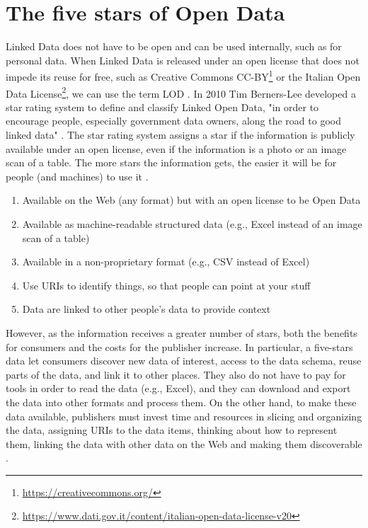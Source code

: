 \section{The five stars of Open Data}
\label{sec:opendatastars}

\newcommand{\Stars}[1]{\clone{#1}{\textcolor{StarColor}{\Large$\bigstar$}}}

Linked Data does not have to be open and can be used internally, such as for personal data. When Linked Data is released under an open license that does not impede its reuse for free, such as Creative Commons CC-BY\footnote{\url{https://creativecommons.org/}} or the Italian Open Data License\footnote{\url{https://www.dati.gov.it/content/italian-open-data-license-v20}}, we can use the term \ac{LOD} \cite{berners2006linked}. In 2010 Tim Berners-Lee developed a star rating system to define and classify Linked Open Data, "in order to encourage people, especially government data owners, along the road to good linked data" \cite{berners2006linked}. The star rating system assigns a star if the information is publicly available under an open license, even if the information is a photo or an image scan of a table. The more stars the information gets, the easier it will be for people (and machines) to use it \cite{berners2006linked}.

\begin{enumerate}[%
align=right,
leftmargin=*,
labelindent=\widthof{\Stars{5}}
]
    \item[\Stars{1}] Available on the Web (any format) but with an open license to be Open Data
    \item[\Stars{2}] Available as machine-readable structured data (e.g., Excel instead of an image scan of a table)
    \item[\Stars{3}] Available in a non-proprietary format (e.g., \acs{CSV} instead of Excel)
    \item[\Stars{4}] Use \acp{URI} to identify things, so that people can point at your stuff
    \item[\Stars{5}] Data are linked to other people's data to provide context
\end{enumerate}

However, as the information receives a greater number of stars, both the benefits for consumers and the costs for the publisher increase. In particular, a five-stars data let consumers discover new data of interest, access to the data schema, reuse parts of the data, and link it to other places. They also do not have to pay for tools in order to read the data (e.g., Excel), and they can download and export the data into other formats and process them. On the other hand, to make these data available, publishers must invest time and resources in slicing and organizing the data, assigning \acp{URI} to the data items, thinking about how to represent them, linking the data with other data on the Web and making them discoverable \cite{bauer2011linked}.

